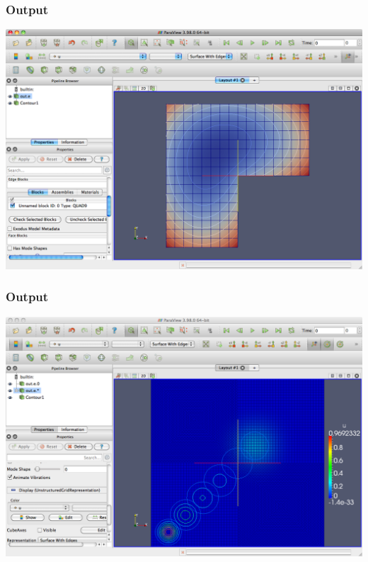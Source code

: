 \frame
{
  \frametitle{Output}
  \begin{center}
    \includegraphics[height=0.8\textheight]{tutorial/laplace_young/screen}
  \end{center}
} 


\frame
{
  \frametitle{Output}
  \begin{center}
    \includegraphics[height=0.8\textheight]{tutorial/transient_convection_diffusion/screen}
  \end{center}
} 

